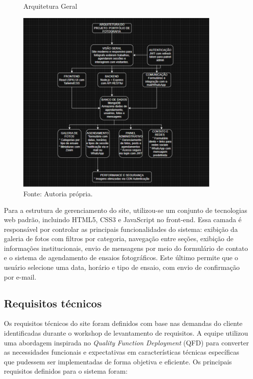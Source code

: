  \begin{figure} [h!]	
    \centering

    \caption{Arquitetura Geral}
    \includegraphics[width=0.9\textwidth]{Figures/Arquitetura_do_projeto.png}
    \caption*{Fonte: Autoria própria.}
    \label{fig:Arquitetura geral}
\end{figure}	

Para a estrutura de gerenciamento do site, utilizou-se um conjunto de tecnologias web padrão, incluindo HTML5, CSS3 e JavaScript no front-end. Essa camada é responsável por controlar as principais funcionalidades do sistema: exibição da galeria de fotos com filtros por categoria, navegação entre seções, exibição de informações institucionais, envio de mensagens por meio do formulário de contato e o sistema de agendamento de ensaios fotográficos. Este último permite que o usuário selecione uma data, horário e tipo de ensaio, com envio de confirmação por e-mail.

\subsection{Requisitos técnicos}
Os requisitos técnicos do site foram definidos com base nas demandas do cliente identificadas durante o workshop de levantamento de requisitos. A equipe utilizou uma abordagem inspirada no \textit{Quality Function Deployment} (QFD) para converter as necessidades funcionais e expectativas em características técnicas específicas que pudessem ser implementadas de forma objetiva e eficiente. Os principais requisitos definidos para o sistema foram:

